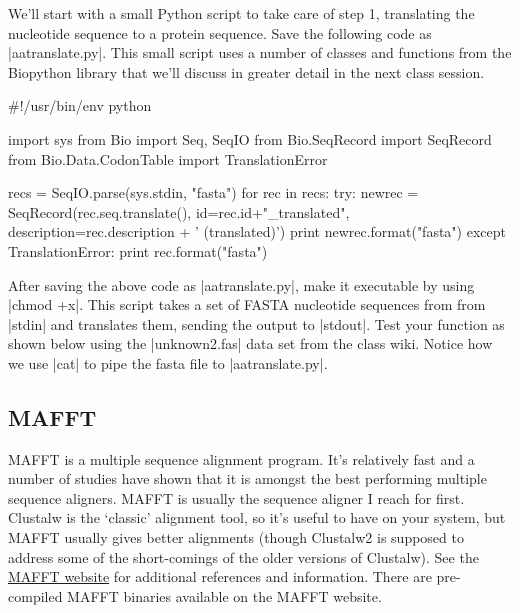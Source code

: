 We'll start with a small Python script to take care of step 1, translating the nucleotide sequence to a protein sequence. Save the following code as |aatranslate.py|.   This small script uses a number of classes and functions from the Biopython library that we'll discuss in greater detail in the next class session.
%
\begin{codeblock}[python]
#!/usr/bin/env python

import sys
from Bio import Seq, SeqIO
from Bio.SeqRecord import SeqRecord
from Bio.Data.CodonTable import TranslationError

recs = SeqIO.parse(sys.stdin, "fasta")
for rec in recs:
    try:
        newrec = SeqRecord(rec.seq.translate(), id=rec.id+"_translated",
                           description=rec.description + ' (translated)')
        print newrec.format("fasta")
    except TranslationError:
        print rec.format("fasta")
\end{codeblock}

After saving the above code as |aatranslate.py|, make it executable by using |chmod +x|.  This script takes a set of FASTA nucleotide sequences from from |stdin| and translates them, sending the output to |stdout|.  Test your function as shown below using the |unknown2.fas| data set from the class wiki. Notice how we use |cat| to pipe the fasta file to |aatranslate.py|.
%


\subsection{MAFFT}

MAFFT is a multiple sequence alignment program. It's relatively fast and a number of studies have shown that it is amongst the best performing multiple sequence aligners. MAFFT is usually the sequence aligner I reach for first.  Clustalw is the `classic' alignment tool, so it's useful to have on your system, but MAFFT usually gives better alignments (though Clustalw2 is supposed to address some of the short-comings of the older versions of Clustalw). See the \href{http://mafft.cbrc.jp/alignment/software/}{MAFFT website} for additional references and information. There are pre-compiled MAFFT binaries available on the MAFFT website.

